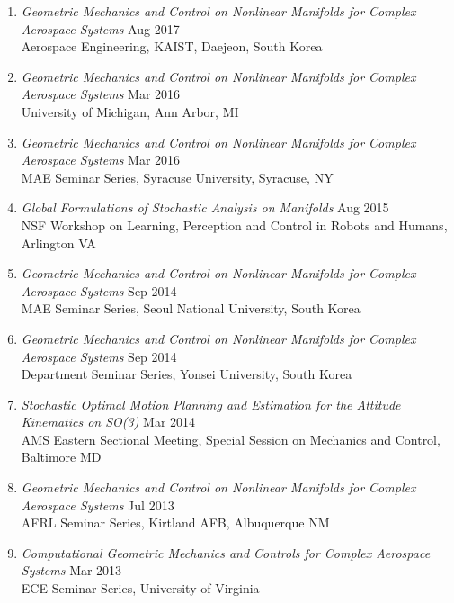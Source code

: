 \documentclass[10pt]{article}
\begin{document}
\begin{enumerate}[itemsep=2pt,parsep=2pt]
\item \textit{Geometric Mechanics and Control on Nonlinear Manifolds for Complex Aerospace Systems}  \hfill Aug 2017\\
    {Aerospace Engineering, KAIST}, Daejeon, South Korea

\item \textit{Geometric Mechanics and Control on Nonlinear Manifolds for Complex Aerospace Systems}  \hfill Mar 2016\\
    {University of Michigan}, Ann Arbor, MI

\item \textit{Geometric Mechanics and Control on Nonlinear Manifolds for Complex Aerospace Systems}  \hfill Mar 2016\\
    {MAE Seminar Series, Syracuse University}, Syracuse, NY

\item \textit{Global Formulations of Stochastic Analysis on Manifolds}  \hfill Aug 2015\\
    {NSF Workshop on Learning, Perception and Control in Robots and Humans}, Arlington VA

\item \textit{Geometric Mechanics and Control on Nonlinear Manifolds for Complex Aerospace Systems}  \hfill Sep 2014\\
    {MAE Seminar Series, Seoul National University}, South Korea

\item \textit{Geometric Mechanics and Control on Nonlinear Manifolds for Complex Aerospace Systems}  \hfill Sep 2014\\
    {Department Seminar Series, Yonsei University}, South Korea

\item \textit{Stochastic Optimal Motion Planning and Estimation for the Attitude Kinematics on SO(3)}  \hfill Mar 2014\\
    {AMS Eastern Sectional Meeting, Special Session on Mechanics and Control}, Baltimore MD

\item \textit{Geometric Mechanics and Control on Nonlinear Manifolds for Complex Aerospace Systems}  \hfill Jul 2013\\
    {AFRL Seminar Series}, Kirtland AFB, Albuquerque NM

\item \textit{Computational Geometric Mechanics and Controls for Complex Aerospace Systems}  \hfill Mar 2013\\
    {ECE Seminar Series}, University of Virginia


\end{enumerate}
\end{document}
